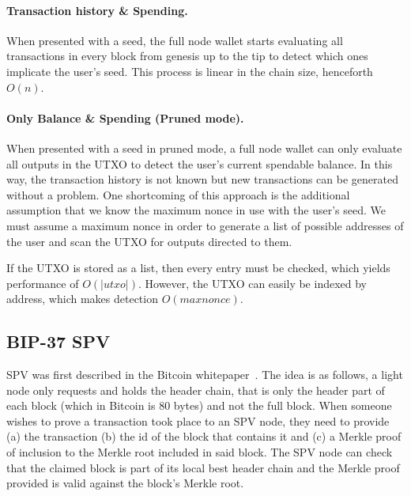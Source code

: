 \documentclass[sigconf,authordraft]{acmart}
\begin{document}
\paragraph{Transaction history \& Spending.}
When presented with a seed, the full node wallet starts evaluating all transactions in every block from genesis up to the tip to detect which ones implicate the user's seed. This process is linear in the chain size, henceforth $O(n)$.

\paragraph{Only Balance \& Spending (Pruned mode).}
When presented with a seed in pruned mode, a full node wallet can only evaluate all outputs in the UTXO to detect the user's current spendable balance. In this way, the transaction history is not known but new transactions can be generated without a problem. One shortcoming of this approach is the additional assumption that we know the maximum nonce in use with the user's seed. We must assume a maximum nonce in order to generate a list of possible addresses of the user and scan the UTXO for outputs directed to them.

If the UTXO is stored as a list, then every entry must be checked, which yields performance of $O(|utxo|)$. However, the UTXO can easily be indexed by address, which makes detection $O(maxnonce)$.
\subsection{BIP-37 SPV}
SPV was first described in the Bitcoin whitepaper~\cite{bitcoin}.
The idea is as follows, a light node only requests and holds the header chain, that is only the header part of each block (which in Bitcoin is 80 bytes) and not the full block. When someone wishes to prove a transaction took place to an SPV node, they need to provide (a) the transaction (b) the id of the block that contains it and (c) a Merkle proof of inclusion to the Merkle root included in said block. The SPV node can check that the claimed block is part of its local best header chain and the Merkle proof provided is valid against the block's Merkle root.
\end{document}
